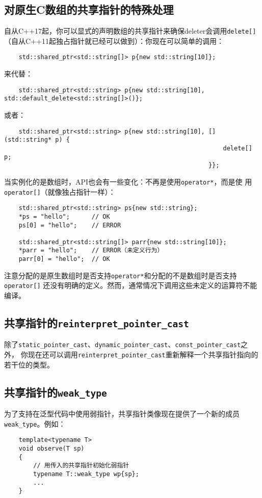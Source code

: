 \subsection{对原生C数组的共享指针的特殊处理}\label{ch28.2.1}
自从C++17起，你可以显式的声明数组的共享指针来确保deleter会调用\texttt{delete[]}
（自从C++11起独占指针就已经可以做到）：你现在可以简单的调用：
\begin{lstlisting}
    std::shared_ptr<std::string[]> p{new std::string[10]};
\end{lstlisting}
来代替：
\begin{lstlisting}
    std::shared_ptr<std::string> p{new std::string[10], std::default_delete<std::string[]>()};
\end{lstlisting}
或者：
\begin{lstlisting}
    std::shared_ptr<std::string> p{new std::string[10], [](std::string* p) {
                                                            delete[] p;
                                                        }};
\end{lstlisting}
当实例化的是数组时，API也会有一些变化：不再是使用\texttt{operator*}，而是使
用\texttt{operator[]}（就像独占指针一样）：
\begin{lstlisting}
    std::shared_ptr<std::string> ps{new std::string};
    *ps = "hello";      // OK
    ps[0] = "hello";    // ERROR

    std::shared_ptr<std::string[]> parr{new std::string[10]};
    *parr = "hello";    // ERROR（未定义行为）
    parr[0] = "hello";  // OK
\end{lstlisting}
注意分配的是原生数组时是否支持\texttt{operator*}和分配的不是数组时是否支持\texttt{operator[]}
还没有明确的定义。然而，通常情况下调用这些未定义的运算符不能编译。

\subsection{共享指针的\texttt{reinterpret\_pointer\_cast}}
除了\texttt{static\_pointer\_cast}、\texttt{dynamic\_pointer\_cast}、\texttt{const\_pointer\_cast}之外，
你现在还可以调用\texttt{reinterpret\_pointer\_cast}重新解释一个共享指针指向的若干位的类型。

\subsection{共享指针的\texttt{weak\_type}}
为了支持在泛型代码中使用弱指针，共享指针类像现在提供了一个新的成员\texttt{weak\_type}。例如：
\begin{lstlisting}
    template<typename T>
    void observe(T sp)
    {
        // 用传入的共享指针初始化弱指针
        typename T::weak_type wp{sp};
        ...
    }
\end{lstlisting}

